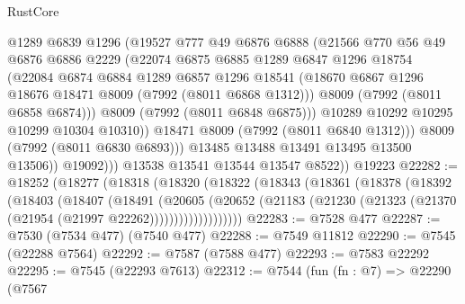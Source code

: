 \begin{lexlean}{RustCore}
\begin{coremodule}
                      @1289
                      @6839
                      @1296
                      (@19527
                        @777
                        @49
                        @6876
                        @6888
                        (@21566
                          @770
                          @56
                          @49
                          @6876
                          @6886
                          @2229
                          (@22074
                            @6875
                            @6885
                            @1289
                            @6847
                            @1296
                            @18754
                            (@22084
                              @6874
                              @6884
                              @1289
                              @6857
                              @1296
                              @18541
                              (@18670 @6867 @1296 @18676 @18471 @8009 (@7992 (@8011 @6868 @1312)))
                              @8009
                              (@7992 (@8011 @6858 @6874)))
                            @8009
                            (@7992 (@8011 @6848 @6875)))
                          @10289
                          @10292
                          @10295
                          @10299
                          @10304
                          @10310))
                      @18471
                      @8009
                      (@7992 (@8011 @6840 @1312)))
                    @8009
                    (@7992 (@8011 @6830 @6893)))
                  @13485
                  @13488
                  @13491
                  @13495
                  @13500
                  @13506))
              @19092)))
        @13538
        @13541
        @13544
        @13547
        @8522))
    @19223
@22282 := @18252
    (@18277
      (@18318
        (@18320
          (@18322
            (@18343
              (@18361
                (@18378
                  (@18392
                    (@18403
                      (@18407
                        (@18491
                          (@20605
                            (@20652
                              (@21183
                                (@21230 (@21323 (@21370 (@21954 (@21997 @22262)))))))))))))))))))
@22283 := @7528 @477
@22287 := @7530 (@7534 @477) (@7540 @477)
@22288 := @7549 @11812
@22290 := @7545 (@22288 @7564)
@22292 := @7587 (@7588 @477)
@22293 := @7583 @22292
@22295 := @7545 (@22293 @7613)
@22312 := @7544
    (fun (fn : @7) =>
    @22290
      (@7567

\end{coremodule}
\end{lexlean}
